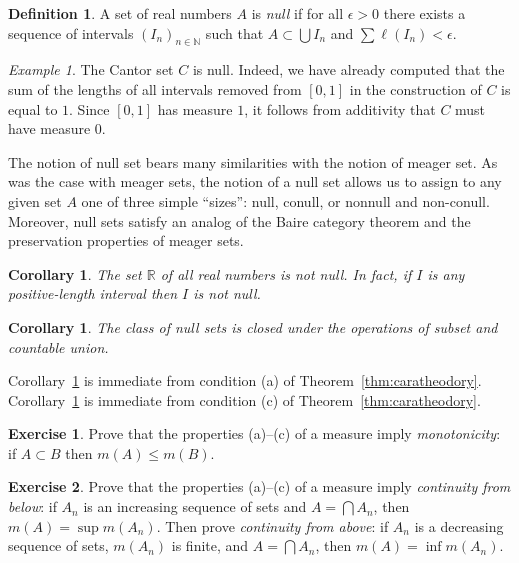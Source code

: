 \documentclass[11pt,oneside]{amsbook}
\newcommand{\N}{\mathbb N}
\newcommand{\R}{\mathbb R}
\theoremstyle{definition}
\newtheorem{exercise}{Exercise}[section]
\theoremstyle{plain}
\newtheorem{corollary}[theorem]{Corollary}
\theoremstyle{definition}
\newtheorem{definition}[theorem]{Definition}
\theoremstyle{remark}
\newtheorem{example}[theorem]{Example}
\numberwithin{equation}{section}
\numberwithin{figure}{section}
\begin{document}
\begin{definition}
  \label{defn:null}
  A set of real numbers $A$ is \emph{null} if for all $\epsilon>0$ there exists a sequence of intervals $(I_n)_{n\in\N}$ such that $A\subset\bigcup I_n$ and $\sum\ell(I_n)<\epsilon$.
\end{definition}

\begin{example}
  The Cantor set $C$ is null. Indeed, we have already computed that the sum of the lengths of all intervals removed from $[0,1]$ in the construction of $C$ is equal to $1$. Since $[0,1]$ has measure $1$, it follows from additivity that $C$ must have measure $0$.
\end{example}

The notion of null set bears many similarities with the notion of meager set. As was the case with meager sets, the notion of a null set allows us to assign to any given set $A$ one of three simple ``sizes'': null, conull, or nonnull and non-conull. Moreover, null sets satisfy an analog of the Baire category theorem and the preservation properties of meager sets.

\begin{corollary}
  \label{cor:interval-nonnull}
  The set $\R$ of all real numbers is not null. In fact, if $I$ is any positive-length interval then $I$ is not null.
\end{corollary}

\begin{corollary}
  \label{cor:null-pres}
  The class of null sets is closed under the operations of subset and countable union.
\end{corollary}

Corollary~\ref{cor:interval-nonnull} is immediate from condition (a) of Theorem~\ref{thm:caratheodory}. Corollary~\ref{cor:null-pres} is immediate from condition (c) of Theorem~\ref{thm:caratheodory}.

\begin{exercise}
  Prove that the properties (a)--(c) of a measure imply \emph{monotonicity}: if $A\subset B$ then $m(A)\leq m(B)$.
\end{exercise}

\begin{exercise}
  \label{exerc:continuity-above}
  Prove that the properties (a)--(c) of a measure imply \emph{continuity from below}: if $A_n$ is an increasing sequence of sets and $A=\bigcap A_n$, then $m(A)=\sup m(A_n)$. Then prove \emph{continuity from above}: if $A_n$ is a decreasing sequence of sets, $m(A_n)$ is finite, and $A=\bigcap A_n$, then $m(A)=\inf m(A_n)$.
\end{exercise}
\end{document}
